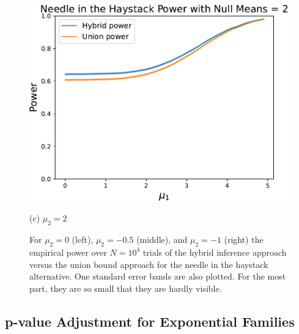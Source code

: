 \documentclass{article}
\begin{document}
\begin{appendix}
\begin{figure}
    \hfill
    \hspace{0.01\textwidth}
    \begin{minipage}{0.32\textwidth}
        \centering
        \includegraphics[width=\textwidth]{fig/hybrid_vs_union_null=2.pdf}
        \caption*{(c) $\mu_2=2$}
    \end{minipage}
    \caption{ For $\mu_2=0$ (left), $\mu_2=-0.5$ (middle), and $\mu_2=-1$ (right) the empirical power over $N=10^4$ trials of the hybrid inference approach versus the union bound approach for the needle in the haystack alternative. One standard error bands are also plotted. For the most part, they are so small that they are hardly visible.  }
    \label{fig:hybrid_union_power}
\end{figure}

\subsection{p-value Adjustment for Exponential Families}
\label{sec:rank_verficiation_adj_appdx}


\end{appendix}
\end{document}
